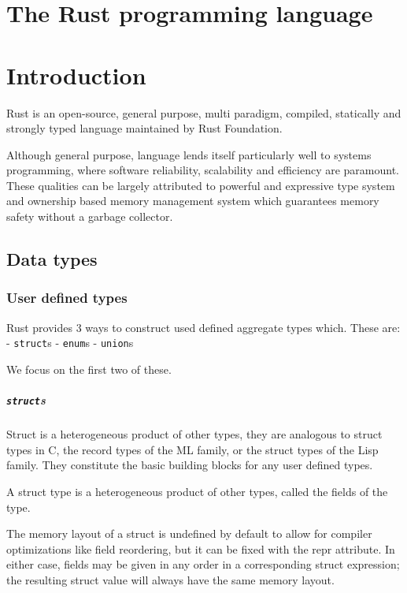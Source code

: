 
\chapter{The Rust programming language}

\chapter*{Introduction}

Rust is an open-source, general purpose, multi paradigm, compiled, statically and strongly typed language maintained by Rust Foundation.

Although general purpose, language lends itself particularly well to systems programming, where software reliability, scalability and efficiency are paramount.
These qualities can be largely attributed to powerful and expressive type system and ownership based memory management system which guarantees memory safety without a garbage collector.

\section{Data types}


\subsection{User defined types}

Rust provides 3 ways to construct used defined aggregate types which.
These are:
- \texttt{struct}s
- \texttt{enum}s
- \texttt{union}s

We focus on the first two of these.

\paragraph{\texttt{struct}s}

Struct is a heterogeneous product of other types, they are analogous to struct types in C, the record types of the ML family, or the struct types of the Lisp family. 
They constitute the basic building blocks for any user defined types.

A struct type is a heterogeneous product of other types, called the fields of the type. 

The memory layout of a struct is undefined by default to allow for compiler optimizations like field reordering, but it can be fixed with the repr attribute. In either case, fields may be given in any order in a corresponding struct expression; the resulting struct value will always have the same memory layout.

